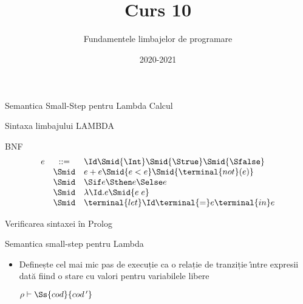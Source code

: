 \documentclass[xcolor=x11names,compress,10pt]{beamer}
\begin{document}
\title{\\Curs 10}
\author{Fundamentele limbajelor de programare} 
\date{2020-2021} 


\frame{\titlepage} 



\begin{section}{Semantica Small-Step pentru Lambda Calcul}

  \begin{frame}[fragile]{Sintaxa limbajului LAMBDA}
    \begin{block}{BNF}
    \[
    \begin{array}{rcl}
      e & ::= & {\Id} \Smid {\Int} \Smid {\Strue} \Smid {\Sfalse} \\
        & \Smid & {e + e} \Smid {e < e} \Smid { \terminal{not}(e) } \\
        & \Smid & \Sif e \Sthen e \Selse e \\
        & \Smid & {\lambda \Id . e} \Smid {e \; e} \\
        & \Smid & \terminal{let} \Id \terminal{=} e \terminal{in} e
    \end{array}
    \]
    \end{block}

    \begin{block}{Verificarea sintaxei în Prolog}
    \end{block}
 \end{frame}

\begin{frame}[fragile]{Semantica small-step pentru Lambda}
\vspace*{0.5cm}
\begin{itemize}
  \item Definește cel mai mic pas de execuție ca o relație de tranziție  \^{\i}ntre expresii
    dată fiind o stare cu valori pentru variabilele libere
  \begin{center}
	$\rho \vdash {}$ \hfill{}
  \end{center}


\end{itemize}
\end{frame}
\end{section}
\end{document}

